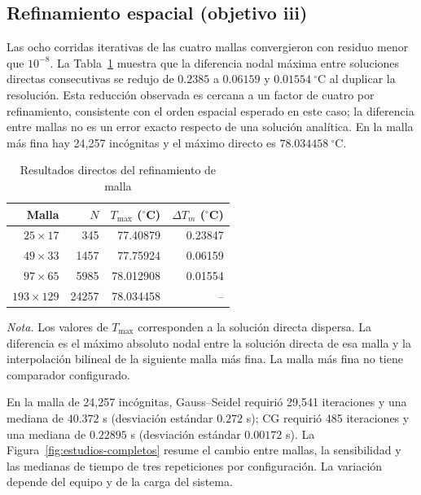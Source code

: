 \subsection{Refinamiento espacial (objetivo iii)}

Las ocho corridas iterativas de las cuatro mallas convergieron con residuo menor que $10^{-8}$. La Tabla~\ref{tab:refinamiento} muestra que la diferencia nodal m\'axima entre soluciones directas consecutivas se redujo de $0.2385$ a $0.06159$ y $0.01554\ ^\circ$C al duplicar la resoluci\'on. Esta reducci\'on observada es cercana a un factor de cuatro por refinamiento, consistente con el orden espacial esperado en este caso; la diferencia entre mallas no es un error exacto respecto de una soluci\'on anal\'itica. En la malla m\'as fina hay 24,257 inc\'ognitas y el m\'aximo directo es $78.034458\ ^\circ$C.

\begin{table}[t]
\centering
\begin{threeparttable}
\caption{Resultados directos del refinamiento de malla}
\label{tab:refinamiento}
\footnotesize
\begin{tabular}{rrrr}
\toprule
Malla & $N$ & $T_{\max}$ ($^\circ$C) & $\Delta T_m$ ($^\circ$C)\\
\midrule
$25\times17$ & 345 & 77.40879 & 0.23847\\
$49\times33$ & 1457 & 77.75924 & 0.06159\\
$97\times65$ & 5985 & 78.012908 & 0.01554\\
$193\times129$ & 24257 & 78.034458 & --\\
\bottomrule
\end{tabular}
\begin{tablenotes}\footnotesize
\item \textit{Nota.} Los valores de $T_{\max}$ corresponden a la soluci\'on directa dispersa. La diferencia es el m\'aximo absoluto nodal entre la soluci\'on directa de esa malla y la interpolaci\'on bilineal de la siguiente malla m\'as fina. La malla m\'as fina no tiene comparador configurado.
\end{tablenotes}
\end{threeparttable}
\end{table}

En la malla de 24,257 inc\'ognitas, Gauss--Seidel requiri\'o 29,541 iteraciones y una mediana de $40.372$ s (desviaci\'on est\'andar $0.272$ s); CG requiri\'o 485 iteraciones y una mediana de $0.22895$ s (desviaci\'on est\'andar $0.00172$ s). La Figura~\ref{fig:estudios-completos} resume el cambio entre mallas, la sensibilidad y las medianas de tiempo de tres repeticiones por configuraci\'on. La variaci\'on depende del equipo y de la carga del sistema.


